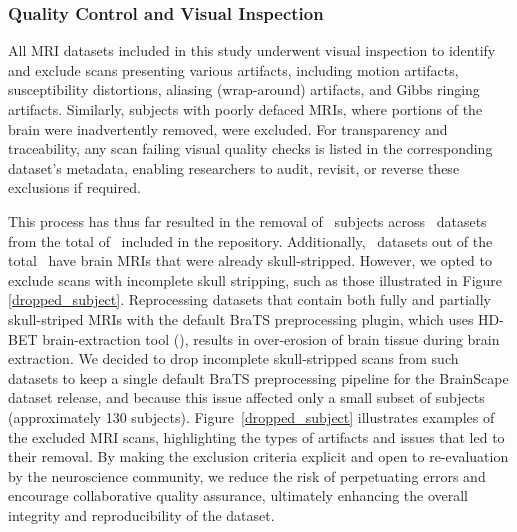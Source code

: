 \subsubsection{Quality Control and Visual Inspection}

All MRI datasets included in this study underwent visual inspection to identify and exclude scans presenting various artifacts, 
including motion artifacts, susceptibility distortions, aliasing (wrap-around) artifacts, and Gibbs ringing artifacts. 
Similarly, subjects with poorly defaced MRIs, where portions of the brain were inadvertently removed, were excluded. For transparency and 
traceability, any scan failing visual quality checks is listed in the corresponding dataset's metadata, enabling researchers to audit, 
revisit, or reverse these exclusions if required.

This process has thus far resulted in the removal of \TotalNumSubjectsRemoved\ subjects across \TotalNumDatasetsWithSubjectsRemoved\ datasets 
from the total of \NumDatasets\ included in the repository. 
Additionally, \NumDatasetsAlreadySkullStripped\ datasets out of the total \NumDatasets\ have brain MRIs that were already skull-stripped. 
However, we opted to exclude scans with incomplete skull stripping, such as those illustrated in Figure \ref{dropped_subject}. 
Reprocessing datasets that contain both fully and partially skull-striped MRIs with the default BraTS preprocessing plugin, 
which uses HD-BET brain-extraction tool (\cite{isensee2019automated}), results in over-erosion of brain tissue during brain extraction.
We decided to drop incomplete skull-stripped scans from such datasets to keep a single default BraTS preprocessing pipeline for the BrainScape dataset release, 
and because this issue affected only a small subset of subjects (approximately 130 subjects).
Figure~\ref{dropped_subject} illustrates examples of the excluded MRI scans, highlighting the types of artifacts and issues that led to their removal. By making the exclusion 
criteria explicit and open to re-evaluation by the neuroscience community, we reduce the risk of perpetuating errors and encourage collaborative quality assurance, 
ultimately enhancing the overall integrity and reproducibility of the dataset.


